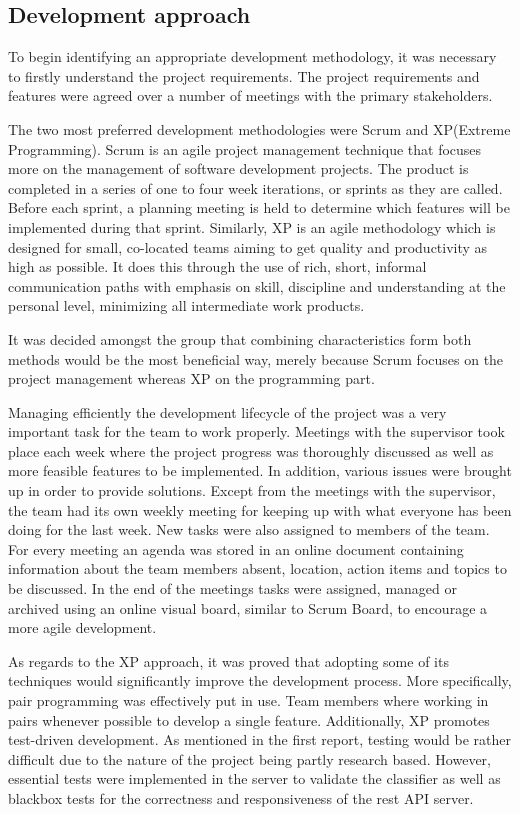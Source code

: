 \subsection{Development approach} 
To begin identifying an appropriate development methodology, it was necessary to firstly understand 
the project requirements. The project requirements and features were agreed over a number of 
meetings with the primary stakeholders.

The two most preferred development methodologies were 
Scrum and XP(Extreme Programming). Scrum is an agile project management technique that focuses more 
on the management of software development projects. The product is completed in a series of one to 
four week iterations, or sprints as they are called. Before each sprint, a planning meeting is held 
to determine which features will be implemented during that sprint. Similarly, XP is an agile 
methodology which is designed for small, co-located teams aiming to get quality and productivity as 
high as possible. It does this through the use of rich, short, informal communication paths with 
emphasis on skill, discipline and understanding at the personal level, minimizing all intermediate 
work products.

It was decided amongst the group that combining characteristics form both methods 
would be the most beneficial way, merely because Scrum focuses on the project management whereas XP 
on the programming part.

Managing efficiently the development lifecycle of the project was a very 
important task for the team to work properly. Meetings with the supervisor took place each week 
where the project progress was thoroughly discussed as well as more feasible features to be 
implemented. In addition, various issues were brought up in order to provide solutions. Except from 
the meetings with the supervisor, the team had its own weekly meeting for keeping up with what 
everyone has been doing for the last week. New tasks were also assigned to members of the team. For 
every meeting an agenda was stored in an online document containing information about the team 
members absent, location, action items and topics to be discussed. In the end of the meetings tasks 
were assigned, managed or archived using an online visual board, similar to Scrum Board, to 
encourage a more agile development.

As regards to the XP approach, it was proved that adopting 
some of its techniques would significantly improve the development process. More specifically, pair 
programming was effectively put in use. Team members where working in pairs whenever possible to 
develop a single feature. Additionally, XP promotes test-driven development. As mentioned in the 
first report, testing would be rather difficult due to the nature of the project being partly 
research based. However, essential tests were implemented in the server to validate the classifier 
as well as blackbox tests for the correctness and responsiveness of the rest API server. 

